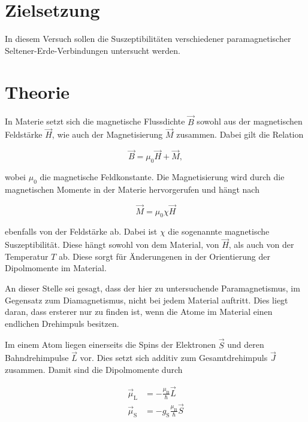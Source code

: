 \section{Zielsetzung}

In diesem Versuch sollen die Suszeptibilitäten verschiedener paramagnetischer Seltener-Erde-Verbindungen untersucht werden.

\section{Theorie}
\label{sec:Theorie}

In Materie setzt sich die magnetische Flussdichte $\vec{B}$ sowohl aus der magnetischen Feldstärke $\vec{H}$, wie auch der Magnetisierung $\vec{M}$ zusammen.
Dabei gilt die Relation 

\begin{equation}
    \label{eqn:mag-allg}
    \vec{B} = \mu_0 \vec{H} + \vec{M},
\end{equation}

wobei $\mu_0$ die magnetische Feldkonstante. 
Die Magnetisierung wird durch die magnetischen Momente in der Materie hervorgerufen und hängt nach 

\begin{equation}
    \label{eqn:magnetisierung}
    \vec{M} = \mu_0 \chi \vec{H}
\end{equation}

ebenfalls von der Feldstärke ab.
Dabei ist $\chi$ die sogenannte magnetische Suszeptibilität. Diese hängt sowohl von dem Material, von $\vec{H}$, als auch von der Temperatur $T$ ab.
Diese sorgt für Änderungenen in der Orientierung der Dipolmomente im Material.

An dieser Stelle sei gesagt, dass der hier zu untersuchende Paramagnetismus, im Gegensatz zum Diamagnetismus, nicht bei jedem Material auftritt.
Dies liegt daran, dass ersterer nur zu finden ist, wenn die Atome im Material einen endlichen Drehimpuls besitzen.

Im einem Atom liegen einerseits die Spins der Elektronen $\vec{S}$ und deren Bahndrehimpulse $\vec{L}$ vor.
Dies setzt sich additiv zum Gesamtdrehimpuls $\vec{J}$ zusammen.
Damit sind die Dipolmomente durch

\begin{align}
    \vec{\mu}_\text{L} &= - \frac{\mu_\text{B}}{\hslash} \vec{L} \\
    \vec{\mu}_\text{S} &= - g_\text{S} \frac{\mu_\text{B}}{\hslash} \vec{S}
\end{align}

